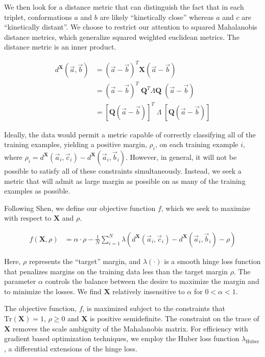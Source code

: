 \documentclass[twocolumn,floatfix,nofootinbib,aps]{revtex4-1}
\begin{document}
We then look for a distance metric that can distinguish the fact that in each triplet, conformations $a$ and $b$ are likely ``kinetically close'' whereas $a$ and $c$ are ``kinetically distant''. We choose to restrict our attention to squared Mahalanobis distance metrics, which generalize squared weighted euclidean metrics. The distance metric is an inner product.

\begin{align}
    d^\mathbf{X}(\vec{a},\vec{b}) &= (\vec{a}-\vec{b})^T \mathbf{X} (\vec{a}-\vec{b}) \\
    &= (\vec{a}-\vec{b})^T \; \mathbf{Q}^T \Lambda \mathbf{Q} \; (\vec{a}-\vec{b}) \\
    &= [\mathbf{Q}(\vec{a}-\vec{b})]^T \; \Lambda \; [\mathbf{Q}(\vec{a}-\vec{b})] \label{eq:proj}
\end{align}

Ideally, the data would permit a metric capable of correctly classifying all of the training examples, yielding a positive margin, $\rho_i$, on each training example $i$, where $\rho_i = d^\mathbf{X}(\vec{a}_i, \vec{c}_i) - d^\mathbf{X}(\vec{a}_i, \vec{b}_i)$. However, in general, it will not be possible to satisfy all of these constraints simultaneously. Instead, we seek a metric that will admit as large margin as possible on as many of the training examples as possible.

Following Shen,\cite{Shen:2010df} we define our objective function $f$, which we seek to maximize with respect to $\mathbf{X}$ and $\rho$.

\begin{align}
    f(\mathbf{X}, \rho) &=  \alpha \cdot \rho - \frac{1}{N} \sum_{i=1}^N \lambda \left( d^\mathbf{X}(\vec{a}_i,\vec{c}_i) - d^\mathbf{X}(\vec{a}_i, \vec{b}_i) - \rho \right)
\end{align}

Here, $\rho$ represents the ``target'' margin, and $\lambda (\cdot)$ is a smooth hinge loss function that penalizes margins on the training data less than the target margin $\rho$.  The  parameter $\alpha$ controls the balance between the desire to maximize the margin and to minimize the losses. We find $\mathbf{X}$ relatively insensitive to $\alpha$ for $0 < \alpha < 1$.

The objective function, $f$, is maximized subject to the constraints that $\mathrm{Tr}(\mathbf{X})=1$, $\rho \geq 0$ and $\mathbf{X}$ is positive semidefinite. The constraint on the trace of $\mathbf{X}$ removes the scale ambiguity of the Mahalanobis matrix. For efficiency with gradient based optimization techniques, we employ the Huber loss function $\lambda_\text{Huber}$, a differential extensions of the hinge loss.
\end{document}
